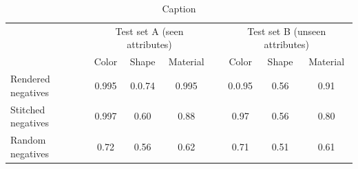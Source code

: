 \begin{table}\centering
{}
\begin{tabular}{@{}lccccccc@{}}\toprule
& \multicolumn{3}{c}{Test set A (seen attributes)} & \phantom{abc}& \multicolumn{3}{c}{Test set B (unseen attributes)} \\
\cmidrule{2-4} \cmidrule{6-8} 
& Color & Shape & Material && Color & Shape & Material \\ \midrule
Rendered negatives & 0.995 & 0.0.74 & 0.995 && 0.0.95 & 0.56 & 0.91\\
Stitched negatives & 0.997 & 0.60 & 0.88 && 0.97 & 0.56 & 0.80\\
Random negatives & 0.72 & 0.56 & 0.62 && 0.71 & 0.51 & 0.61\\
\bottomrule
\end{tabular}
\caption{Caption}
\end{table}